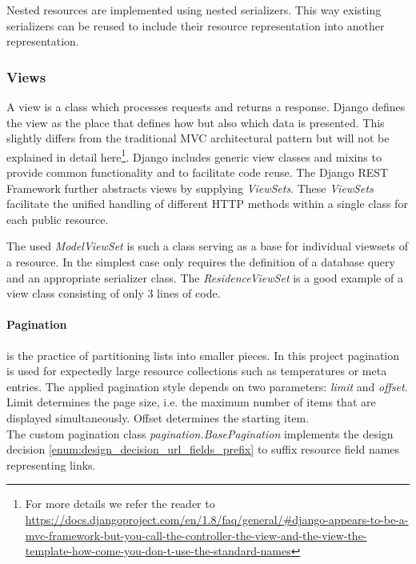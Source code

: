 Nested resources are implemented using nested serializers.
This way existing serializers can be reused to include their resource representation into another representation.


\subsubsection{Views}
\label{sec:server_infrastructure_views}

A view is a class which processes requests and returns a response.
Django defines the view as the place that defines how but also which data is presented.
This slightly differs from the traditional MVC architectural pattern but will not be explained in detail here\footnote{For more details we refer the reader to \url{https://docs.djangoproject.com/en/1.8/faq/general/\#django-appears-to-be-a-mvc-framework-but-you-call-the-controller-the-view-and-the-view-the-template-how-come-you-don-t-use-the-standard-names}}.
Django includes generic view classes and mixins to provide common functionality and to facilitate code reuse.
The Django REST Framework further abstracts views by supplying \emph{ViewSets}.
These \emph{ViewSets} facilitate the unified handling of different HTTP methods within a single class for each public resource.

The used \emph{ModelViewSet} is such a class serving as a base for individual viewsets of a resource.
In the simplest case only requires the definition of a database query and an appropriate serializer class.
The \emph{ResidenceViewSet} is a good example of a view class consisting of only 3 lines of code.

\paragraph{Pagination} is the practice of partitioning lists into smaller pieces.
In this project pagination is used for expectedly large resource collections such as temperatures or meta entries.
The applied pagination style depends on two parameters: \emph{limit} and \emph{offset}.
Limit determines the page size, i.e. the maximum number of items that are displayed simultaneously.
Offset determines the starting item.\\
The custom pagination class \emph{pagination.BasePagination} implements the design decision \ref{enum:design_decision_url_fields_prefix} to suffix resource field names representing links.

